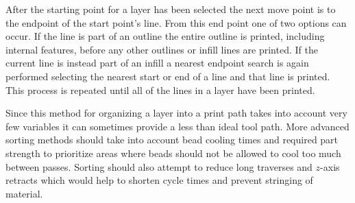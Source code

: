 \documentclass[main.tex]{subfiles}
\begin{document}
After the starting point for a layer has been selected the next move point is to the endpoint of the start point's line.
From this end point one of two options can occur.
If the line is part of an outline the entire outline is printed, including internal features, before any other outlines or infill lines are printed.
If the current line is instead part of an infill a nearest endpoint search is again performed selecting the nearest start or end of a line and that line is printed.
This process is repeated until all of the lines in a layer have been printed.

Since this method for organizing a layer into a print path takes into account very few variables it can sometimes provide a less than ideal tool path.
More advanced sorting methods should take into account bead cooling times and required part strength to prioritize areas where beads should not be allowed to cool too much between passes.
Sorting should also attempt to reduce long traverses and $z$\nobreakdash-axis retracts which would help to shorten cycle times and prevent stringing of material.
\end{document}

